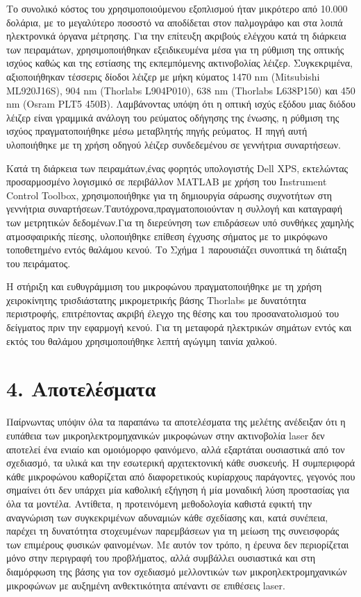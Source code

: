 \documentclass[12pt,a4paper]{report}
\begin{document}
	Το συνολικό κόστος του χρησιμοποιούμενου εξοπλισμού ήταν μικρότερο από 10.000 δολάρια, με το μεγαλύτερο ποσοστό να αποδίδεται στον παλμογράφο και στα λοιπά ηλεκτρονικά όργανα μέτρησης.
	Για την επίτευξη ακριβούς ελέγχου κατά τη διάρκεια των πειραμάτων, χρησιμοποιήθηκαν εξειδικευμένα μέσα για τη ρύθμιση της οπτικής ισχύος καθώς και της εστίασης της εκπεμπόμενης ακτινοβολίας λέιζερ. Συγκεκριμένα, αξιοποιήθηκαν τέσσερις δίοδοι λέιζερ με μήκη κύματος 1470 nm (Mitsubishi ML920J16S), 904 nm (Thorlabs L904P010), 638 nm (Thorlabs L638P150) και 450 nm (Osram PLT5 450B).	Λαμβάνοντας υπόψη ότι η οπτική ισχύς εξόδου μιας διόδου λέιζερ είναι γραμμικά ανάλογη του ρεύματος οδήγησης της ένωσης, η ρύθμιση της ισχύος πραγματοποιήθηκε μέσω μεταβλητής πηγής ρεύματος. Η πηγή αυτή υλοποιήθηκε με τη χρήση οδηγού λέιζερ συνδεδεμένου σε γεννήτρια συναρτήσεων. 
	
	Κατά τη διάρκεια των πειραμάτων,ένας φορητός υπολογιστής Dell XPS, εκτελώντας προσαρμοσμένο λογισμικό σε περιβάλλον MATLAB με χρήση του Instrument Control Toolbox, χρησιμοποιήθηκε για τη δημιουργία σάρωσης συχνοτήτων στη γεννήτρια συναρτήσεων.Ταυτόχρονα,πραγματοποιούνταν η συλλογή και καταγραφή των μετρητικών δεδομένων.Για τη διερεύνηση των επιδράσεων υπό συνθήκες χαμηλής ατμοσφαιρικής πίεσης, υλοποιήθηκε επίθεση έγχυσης σήματος με το μικρόφωνο τοποθετημένο εντός θαλάμου κενού. Το Σχήμα 1 παρουσιάζει συνοπτικά τη διάταξη του πειράματος. 
	
	Η στήριξη και ευθυγράμμιση του μικροφώνου πραγματοποιήθηκε με τη χρήση χειροκίνητης τρισδιάστατης μικρομετρικής βάσης Thorlabs με δυνατότητα περιστροφής, επιτρέποντας ακριβή έλεγχο της θέσης και του προσανατολισμού του δείγματος πριν την εφαρμογή κενού. Για τη μεταφορά ηλεκτρικών σημάτων εντός και εκτός του θαλάμου χρησιμοποιήθηκε λεπτή αγώγιμη ταινία χαλκού.
	
	\vspace{1cm}
	

	\chapter*{4. Αποτελέσματα }
	
	\vspace{0.3cm}
	
	Παίρνωντας υπόψιν όλα τα παραπάνω τα αποτελέσματα της μελέτης ανέδειξαν ότι η ευπάθεια των μικροηλεκτρομηχανικών μικροφώνων στην ακτινοβολία laser δεν αποτελεί ένα ενιαίο και ομοιόμορφο φαινόμενο, αλλά εξαρτάται ουσιαστικά από τον σχεδιασμό, τα υλικά και την εσωτερική αρχιτεκτονική κάθε συσκευής. Η συμπεριφορά κάθε μικροφώνου καθορίζεται από διαφορετικούς κυρίαρχους παράγοντες, γεγονός που σημαίνει ότι δεν υπάρχει μία καθολική εξήγηση ή μία μοναδική λύση προστασίας για όλα τα μοντέλα. Αντίθετα, η προτεινόμενη μεθοδολογία καθιστά εφικτή την αναγνώριση των συγκεκριμένων αδυναμιών κάθε σχεδίασης και, κατά συνέπεια, παρέχει τη δυνατότητα στοχευμένων παρεμβάσεων για τη μείωση της συνεισφοράς των επιμέρους φυσικών φαινομένων. Με αυτόν τον τρόπο, η έρευνα δεν περιορίζεται μόνο στην περιγραφή του προβλήματος, αλλά συμβάλλει ουσιαστικά και στη διαμόρφωση της βάσης για τον σχεδιασμό μελλοντικών των μικροηλεκτρομηχανικών μικροφώνων με αυξημένη ανθεκτικότητα απέναντι σε επιθέσεις laser.
	
\end{document}
